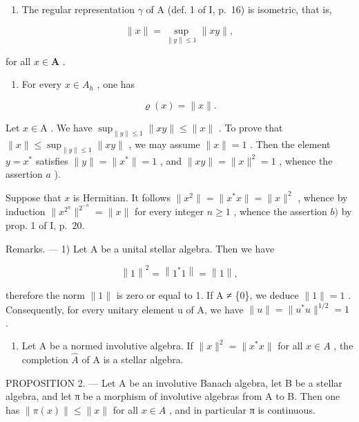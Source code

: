 \begin{enumerate}
\def\labelenumi{\alph{enumi})}
\tightlist
\item
  The regular representation \(\gamma\) of A (def. 1 of I, p.~16) is isometric, that is,
\end{enumerate}

\[
\| x \| = \sup _ {\| y \| \leqslant 1} \| x y \|,
\]

for all \(x\in \mathbf{A}\) .

\begin{enumerate}
\def\labelenumi{\alph{enumi})}
\setcounter{enumi}{1}
\tightlist
\item
  For every \(x \in A_{h}\) , one has
\end{enumerate}

\[
\varrho (x) = \| x \|.\tag{2}
\]

Let \(x \in \mathrm{A}\) . We have \(\sup_{\| y \| \leqslant 1} \| xy \| \leqslant \| x \|\) . To prove that \(\| x \| \leqslant \sup_{\| y \| \leqslant 1} \| xy \|\) , we may assume \(\| x \| = 1\) . Then the element \(y = x^*\) satisfies \(\| y \| = \| x^* \| = 1\) , and \(\| xy \| = \| x \|^2 = 1\) , whence the assertion \(a\) ).

Suppose that \(x\) is Hermitian. It follows \(\| x^2 \| = \| x^* x \| = \| x \|^2\) , whence by induction \(\| x^{2^n} \|^{2^{-n}} = \| x \|\) for every integer \(n \geqslant 1\) , whence the assertion \(b)\) by prop. 1 of I, p.~20.

Remarks. --- 1) Let A be a unital stellar algebra. Then we have

\[
\left\| 1 \right\| ^ {2} = \left\| 1 ^ {*} 1 \right\| = \left\| 1 \right\|,
\]

therefore the norm \(\|1\|\) is zero or equal to 1. If A ≠ \{0\}, we deduce \(\|1\| = 1\) . Consequently, for every unitary element u of A, we have \(\|u\| = \|u^{*}u\|^{1/2} = 1\) .

\begin{enumerate}
\def\labelenumi{\arabic{enumi})}
\setcounter{enumi}{1}
\tightlist
\item
  Let A be a normed involutive algebra. If \(\|x\|^{2}=\|x^{*}x\|\) for all \(x\in A\) , the completion \(\widehat{A}\) of A is a stellar algebra.
\end{enumerate}

PROPOSITION 2. --- Let A be an involutive Banach algebra, let B be a stellar algebra, and let π be a morphism of involutive algebras from A to B. Then one has \(\|\pi(x)\| \leqslant \|x\|\) for all \(x \in A\) , and in particular π is continuous.

